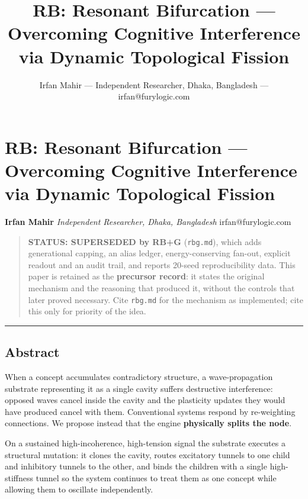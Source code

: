 \documentclass[
  11pt,
  a4paper,
]{article}
\title{RB: Resonant Bifurcation --- Overcoming Cognitive Interference
via Dynamic Topological Fission}
\author{Irfan Mahir --- Independent Researcher, Dhaka, Bangladesh ---
irfan@furylogic.com}
\date{}
\begin{document}
\maketitle

{
\hypersetup{linkcolor=}
\setcounter{tocdepth}{3}
\tableofcontents
}
\section{RB: Resonant Bifurcation --- Overcoming Cognitive Interference
via Dynamic Topological
Fission}\label{rb-resonant-bifurcation-overcoming-cognitive-interference-via-dynamic-topological-fission}

\textbf{Irfan Mahir} \emph{Independent Researcher, Dhaka, Bangladesh}
irfan@furylogic.com

\begin{quote}
\textbf{STATUS: SUPERSEDED by RB+G} (\texttt{rbg.md}), which adds
generational capping, an alias ledger, energy-conserving fan-out,
explicit readout and an audit trail, and reports 20-seed reproducibility
data. This paper is retained as the \textbf{precursor record}: it states
the original mechanism and the reasoning that produced it, without the
controls that later proved necessary. Cite \texttt{rbg.md} for the
mechanism as implemented; cite this only for priority of the idea.
\end{quote}

\begin{center}\rule{0.5\linewidth}{0.5pt}\end{center}

\subsection{Abstract}\label{abstract}

When a concept accumulates contradictory structure, a wave-propagation
substrate representing it as a single cavity suffers destructive
interference: opposed waves cancel inside the cavity and the plasticity
updates they would have produced cancel with them. Conventional systems
respond by re-weighting connections. We propose instead that the engine
\textbf{physically splits the node}.

On a sustained high-incoherence, high-tension signal the substrate
executes a structural mutation: it clones the cavity, routes excitatory
tunnels to one child and inhibitory tunnels to the other, and binds the
children with a single high-stiffness tunnel so the system continues to
treat them as one concept while allowing them to oscillate
independently.
\end{document}
